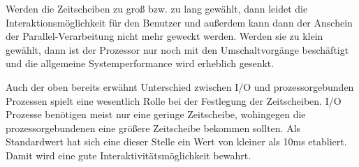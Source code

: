 Werden die Zeitscheiben zu groß bzw. zu lang gewählt, dann leidet die Interaktionsmöglichkeit für den Benutzer und außerdem kann dann der Anschein der Parallel\--Ver\-arbeitung nicht mehr geweckt werden.
Werden sie zu klein gewählt, dann ist der Prozessor nur noch mit den Umschaltvorgänge beschäftigt und die allgemeine Systemperformance wird erheblich gesenkt.

Auch der oben bereits erwähnt Unterschied zwischen I/O und prozessorgebunden Prozessen spielt eine wesentlich Rolle bei der Festlegung der Zeitscheiben. I/O Prozesse benötigen meist nur eine geringe Zeitscheibe, wohingegen die prozessorgebundenen eine größere Zeitscheibe bekommen sollten. Als Standardwert hat sich eine dieser Stelle ein Wert von kleiner als 10ms etabliert. Damit wird eine gute Interaktivitätsmöglichkeit bewahrt.
%
